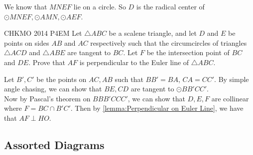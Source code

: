 \begin{minipage}{.5\linewidth}
    \begin{prooof}
        We know that $MNEF$ lie on a circle. So $D$ is the radical center of
        $\odot MNEF, \odot AMN, \odot AEF$.
    \end{prooof}
\end{minipage}\hfill%
\begin{minipage}{.45\linewidth}
\end{minipage}



\begin{minipage}{.54\linewidth}
    {CHKMO 2014 P4}{EM}{
        Let $\triangle ABC$ be a scalene triangle, and let $D$ and $E$ be points
        on sides $AB$ and $AC$ respectively such that the circumcircles of
        triangles $\triangle ACD$ and $\triangle ABE$ are tangent to $BC$. Let $F$
        be the intersection point of $BC$ and $DE$. Prove that $AF$ is
        perpendicular to the Euler line of $\triangle ABC$.
    }
    \begin{solution}
        Let $B', C'$ be the points on $AC, AB$ such that $BB' = BA$, $CA = CC'$.
        By simple angle chasing, we can show that $BE, CD$ are tangent to $\odot
        BB'CC'$.\\

        Now by Pascal's theorem on $BBB'CCC'$, we can show that $D, E, F$ are
        collinear where $F = BC\cap B'C'$. Then by \autoref{lemma:Perpendicular on
        Euler Line}, we have that $AF\perp HO$.
    \end{solution}

\end{minipage}\hfill%
\begin{minipage}{.45\linewidth}
\end{minipage}



\newpage
\subsection{Assorted Diagrams}


